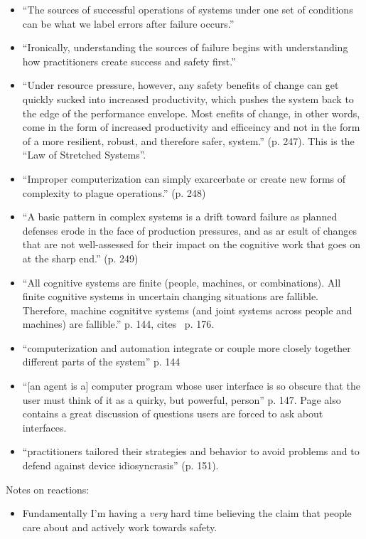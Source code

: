\documentclass[a4paper]{book}
\begin{document}
\begin{itemize}

\item ``The sources of successful operations of systems under one set of conditions can be what we label errors after failure occurs.''
\item ``Ironically, understanding the sources of failure begins with understanding how practitioners create success and safety first.''
\item ``Under resource pressure, however, any safety benefits of change can get quickly sucked into increased productivity,
which pushes the system back to the edge of the performance envelope.
Most enefits of change, in other words, come in the form of increased productivity and efficeincy and not in the form of a more resilient, robust, and therefore safer, system.'' (p. 247). This is the ``Law of Stretched Systems''.
\item ``Improper computerization can simply exarcerbate or create new forms of complexity to plague operations.'' (p. 248)
\item ``A basic pattern in complex systems is a drift toward failure as planned defenses erode in the face of production pressures, and as ar esult of changes that are not well-assessed for their impact on the cognitive work that goes on at the sharp end.'' (p. 249)
\item ``All cognitive systems are finite (people, machines, or combinations).
All finite cognitive systems in uncertain changing situations are fallible.
Therefore, machine cognititve systems (and joint systems across people and machines) are fallible.'' p. 144, cites~\cite{0849339332} p. 176.
\item ``computerization and automation integrate or couple more closely together different parts of the system'' p. 144
\item ``[an agent is a] computer program whose user interface is so obscure that the user must think of it as a quirky, but powerful, person'' p. 147. Page also contains a great discussion of questions users are forced to ask about interfaces.
\item ``practitioners tailored their strategies and behavior to avoid problems and to defend against device idiosyncrasis'' (p. 151).
\end{itemize}

Notes on reactions:

\begin{itemize}
\item Fundamentally I'm having a \emph{very} hard time believing the claim that people care about and actively work towards safety.
\end{itemize}
\end{document}
